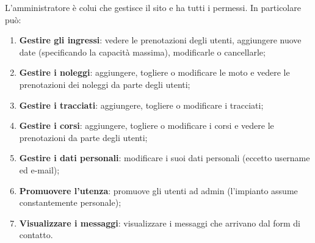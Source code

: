 L'amministratore è colui che gestisce il sito e ha tutti i permessi.
In particolare può:
\begin{enumerate}
    \item \textbf{Gestire gli ingressi}: vedere le prenotazioni degli utenti, aggiungere nuove date (specificando la capacità massima), modificarle o cancellarle;
    
    \item \textbf{Gestire i noleggi}: aggiungere, togliere o modificare le moto e vedere le prenotazioni dei noleggi da parte degli utenti;
    
    \item \textbf{Gestire i tracciati}: aggiungere, togliere o modificare i tracciati;
    
    \item \textbf{Gestire i corsi}: aggiungere, togliere o modificare i corsi e vedere le prenotazioni da parte degli utenti;
    
    \item \textbf{Gestire i dati personali}: modificare i suoi dati personali (eccetto username ed e-mail);
    
    \item \textbf{Promuovere l'utenza}: promuove gli utenti ad admin (l'impianto assume constantemente personale);
    
    \item \textbf{Visualizzare i messaggi}: visualizzare i messaggi che arrivano dal form di contatto.
\end{enumerate}